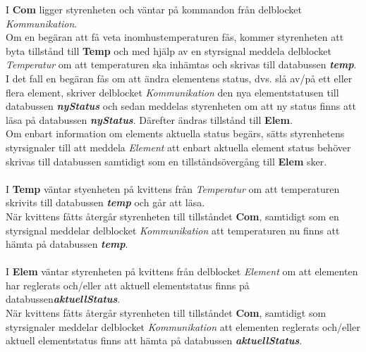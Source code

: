 \documentclass[a4paper]{scrartcl}
\begin{document}
		I \textbf{Com} ligger styrenheten och väntar på kommandon från delblocket \emph{Kommunikation}.
		\\
		Om en begäran att få veta inomhustemperaturen fås, kommer styrenheten att byta tillstånd till \textbf{Temp} och med hjälp av
		en styrsignal meddela delblocket \emph{Temperatur} om att temperaturen ska inhämtas och skrivas till databussen \textbf{\emph{temp}}.
		\\
		I det fall en begäran fås om att ändra elementens status, dvs. slå av/på ett eller flera element, skriver delblocket \emph{Kommunikation}
		den nya elementstatusen till databussen \textbf{\emph{nyStatus}} och sedan meddelas styrenheten om att ny status finns att läsa på databussen \textbf{\emph{nyStatus}}. Därefter
		ändras tillstånd till \textbf{Elem}.
		\\
		Om enbart information om elements aktuella status begärs, sätts styrenhetens styrsignaler till att meddela \emph{Element}
		att enbart aktuella element status behöver skrivas till databussen samtidigt som en tillståndsövergång till \textbf{Elem} sker.
		\\\\
		I \textbf{Temp} väntar styenheten på kvittens från \emph{Temperatur} om att temperaturen skrivits till databussen \textbf{\emph{temp}}
		och går att läsa.
		\\
		När kvittens fåtts återgår styrenheten till tillståndet \textbf{Com}, samtidigt som en styrsignal meddelar delblocket \emph{Kommunikation}
		att temperaturen nu finns att hämta på databussen \textbf{\emph{temp}}.
		\\\\
		I \textbf{Elem} väntar styrenheten på kvittens från delblocket \emph{Element} om att elementen har reglerats och/eller
		att aktuell elementstatus finns på databussen\textbf{\emph{aktuellStatus}}.
		\\
		När kvittens fåtts återgår styrenheten till tillståndet \textbf{Com}, samtidigt som styrsignaler meddelar delblocket \emph{Kommunikation}
		att elementen reglerats och/eller aktuell elementstatus finns att hämta på databussen \textbf{\emph{aktuellStatus}}.
		
	
	\clearpage
\end{document}
